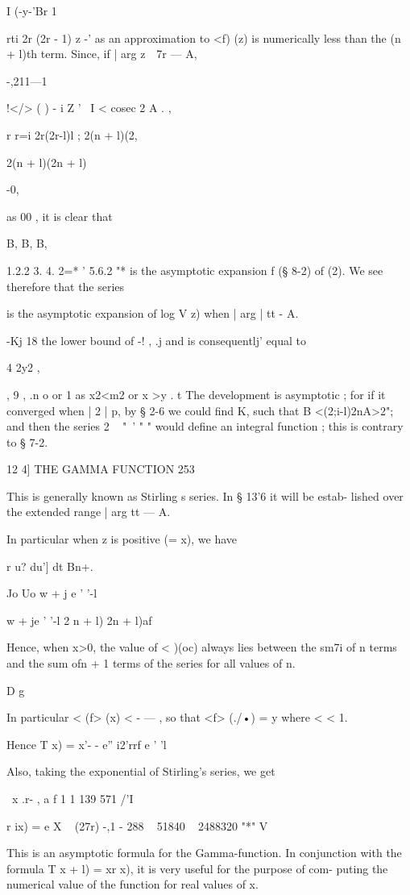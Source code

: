I (-y-'Br 1

rti 2r (2r - 1) z -' as an approximation to <f) (z) is numerically
less than the (n + l)th term. Since, if | arg z\ \ 7r — A,

-,211—1

!</> ( ) - i Z ' \ I < cosec 2 A . ,

r r=i 2r(2r-l)l ; 2(n + l)(2,

2(n + l)(2n + l)

-0,

as 00 , it is clear that

B, B, B,

1.2.2 3. 4. 2=* ' 5.6.2 "* is the asymptotic expansion f (§ 8-2) of
(2). We see therefore that the series

is the asymptotic expansion of log V z) when | arg | tt - A.

-Kj 18 the lower bound of -! , .j and is consequentlj' equal to

4 2y2 ,

, 9 , .n o or 1 as x2<m2 or x >y . t The development is asymptotic ;
for if it converged when | 2 | p, by § 2-6 we could find K, such that
B <(2;i-l)2nA>2"; and then the series 2 ~ "~' " " would define an
integral function ; this is contrary to § 7-2.

12 4] THE GAMMA FUNCTION 253

This is generally known as Stirling s series. In § 13'6 it will be
estab- lished over the extended range | arg tt — A.

In particular when z is positive (= x), we have

r u? du'] dt Bn+.

Jo Uo w + j e ' '-l

w + je ' '-l 2 n + l) 2n + l)af

Hence, when x>0, the value of < )(oc) always lies between the sm7i of
n terms and the sum ofn + 1 terms of the series for all values of n.

D g

In particular < (f> (x) < - — , so that <f> (./•) = y where < < 1.

Hence T x) = x'- - e'' i2'rrf e ' 'l

Also, taking the exponential of Stirling's series, we get

\ x .r- , a f 1 1 139 571 /'I

r ix) = e X ~ (27r) -,1 - 288 ~ 51840 ~ 2488320 "*" V

This is an asymptotic formula for the Gamma-function. In conjunction
with the formula T x + l) = xr x), it is very useful for the purpose
of com- puting the numerical value of the function for real values of
x.

